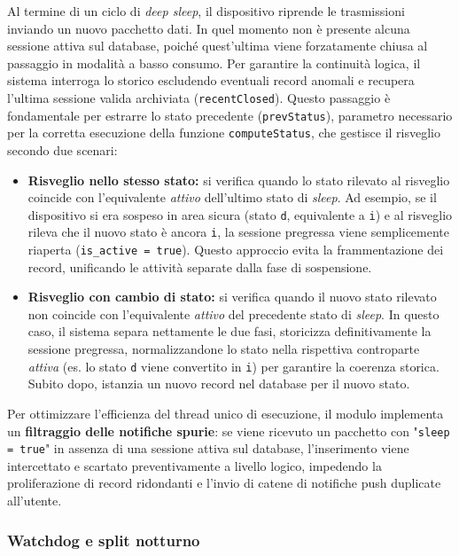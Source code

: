 \documentclass[12pt,a4paper]{article}
\begin{document}
Al termine di un ciclo di \textit{deep sleep}, il dispositivo riprende le trasmissioni inviando un nuovo pacchetto dati. 
In quel momento non è presente alcuna sessione attiva sul database, 
poiché quest'ultima viene forzatamente chiusa al passaggio in modalità a basso consumo.
Per garantire la continuità logica, il sistema interroga lo storico escludendo eventuali 
record anomali e recupera l'ultima sessione valida archiviata (\texttt{recentClosed}). 
Questo passaggio è fondamentale per estrarre lo stato precedente (\texttt{prevStatus}), 
parametro necessario per la corretta esecuzione della funzione \texttt{computeStatus},
che gestisce il risveglio secondo due scenari:
\begin{itemize}
    \item \textbf{Risveglio nello stesso stato:} si verifica quando lo stato rilevato al risveglio coincide con l'equivalente \textit{attivo} dell'ultimo stato di \textit{sleep}. Ad esempio, se il dispositivo si era sospeso in area sicura (stato \texttt{d}, equivalente a \texttt{i}) e al risveglio rileva che il nuovo stato è ancora \texttt{i}, la sessione pregressa viene semplicemente riaperta (\texttt{is\_active = true}). Questo approccio evita la frammentazione dei record, unificando le attività separate dalla fase di sospensione.
    \item \textbf{Risveglio con cambio di stato:} si verifica quando il nuovo stato rilevato non coincide con l'equivalente \textit{attivo} del precedente stato di \textit{sleep}. In questo caso, il sistema separa nettamente le due fasi, storicizza definitivamente la sessione pregressa, normalizzandone lo stato nella rispettiva controparte \textit{attiva} (es. lo stato \texttt{d} viene convertito in \texttt{i}) per garantire la coerenza storica. Subito dopo, istanzia un nuovo record nel database per il nuovo stato. 
\end{itemize}

Per ottimizzare l'efficienza del thread unico di esecuzione, il modulo implementa 
un \textbf{filtraggio delle notifiche spurie}: 
se viene ricevuto un pacchetto con "\texttt{sleep = true}" in assenza di una sessione attiva sul database, 
l'inserimento viene intercettato e scartato preventivamente a livello logico, 
impedendo la proliferazione di record ridondanti e l'invio di catene di notifiche push duplicate all'utente.

\subsubsection{Watchdog e split notturno}
\end{document}
